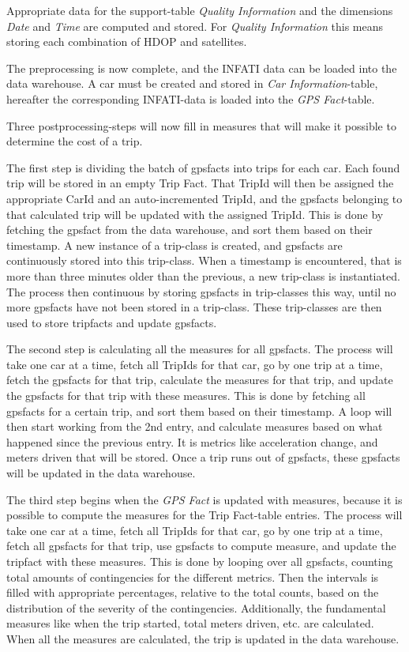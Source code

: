Appropriate data for the support-table \textit{Quality Information} and the dimensions \textit{Date} and \textit{Time} are computed and stored. For \textit{Quality Information} this means storing each combination of HDOP and satellites.

The preprocessing is now complete, and the INFATI data can be loaded into the data warehouse. A car must be created and stored in \textit{Car Information}-table, hereafter the corresponding INFATI-data is loaded into the \textit{GPS Fact}-table. 

Three postprocessing-steps will now fill in measures that will make it possible to determine the cost of a trip. 

The first step is dividing the batch of gpsfacts into trips for each car. Each found trip will be stored in an empty Trip Fact. That TripId will then be assigned the appropriate CarId and an auto-incremented TripId, and the gpsfacts belonging to that calculated trip will be updated with the assigned TripId. This is done by fetching the gpsfact from the data warehouse, and sort them based on their timestamp. A new instance of a trip-class is created, and gpsfacts are continuously stored into this trip-class. When a timestamp is encountered, that is more than three minutes older than the previous, a new trip-class is instantiated. The process then continuous by storing gpsfacts in trip-classes this way, until no more gpsfacts have not been stored in a trip-class. These trip-classes are then used to store tripfacts and update gpsfacts.

The second step is calculating all the measures for all gpsfacts. The process will take one car at a time, fetch all TripIds for that car, go by one trip at a time, fetch the gpsfacts for that trip, calculate the measures for that trip, and update the gpsfacts for that trip with these measures. This is done by fetching all gpsfacts for a certain trip, and sort them based on their timestamp. A loop will then start working from the 2nd entry, and calculate measures based on what happened since the previous entry. It is metrics like acceleration change, and meters driven that will be stored. Once a trip runs out of gpsfacts, these gpsfacts will be updated in the data warehouse.

The third step begins when the \textit{GPS Fact} is updated with measures, because it is possible to compute the measures for the Trip Fact-table entries. The process will take one car at a time, fetch all TripIds for that car, go by one trip at a time, fetch all gpsfacts for that trip, use gpsfacts to compute measure, and update the tripfact with these measures. This is done by looping over all gpsfacts, counting total amounts of contingencies for the different metrics. Then the intervals is filled with appropriate percentages, relative to the total counts, based on the distribution of the severity of the contingencies. Additionally, the fundamental measures like when the trip started, total meters driven, etc. are calculated. When all the measures are calculated, the trip is updated in the data warehouse.

